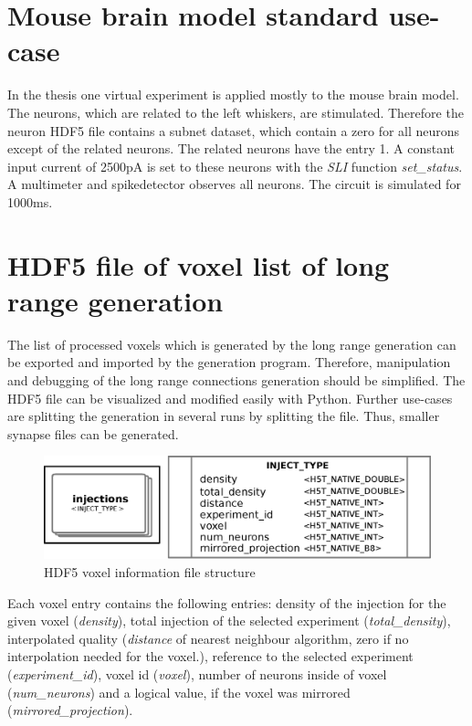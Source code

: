 \section{Mouse brain model standard use-case}
\label{ambmusecase}
In the thesis one virtual experiment is applied mostly to the mouse brain model.
The neurons, which are related to the left whiskers, are stimulated.
Therefore the neuron HDF5 file contains a subnet dataset, which contain a zero
for all neurons except of the related neurons. The related neurons have the entry 1.
A constant input current of 2500pA is set to these neurons with the \emph{SLI} function \emph{set\_status}.
A multimeter and spikedetector observes all neurons.
The circuit is simulated for 1000ms.

\section{HDF5 file of voxel list of long range generation}
\label{file:voxelinfo}
The list of processed voxels which is generated by the long range generation can be exported and imported
by the generation program. Therefore, manipulation and debugging of the long range connections generation should be
simplified. The HDF5 file can be visualized and modified easily with Python. Further use-cases are 
splitting the generation in several runs by splitting the file. Thus, smaller synapse files can be generated.

\begin{figure}[ht!]
\centering
\includegraphics[scale=0.6]{pictures/hdf5_voxel_format.eps}
\caption{HDF5 voxel information file structure}
\end{figure}

Each voxel entry contains the following entries: density of the injection for the given voxel (\emph{density}),
total injection of the selected experiment (\emph{total\_density}),
interpolated quality (\emph{distance} of nearest neighbour algorithm, zero if no interpolation needed for the voxel.),
reference to the selected experiment (\emph{experiment\_id}),
voxel id (\emph{voxel}),
number of neurons inside of voxel (\emph{num\_neurons}) and
a logical value, if the voxel was mirrored (\emph{mirrored\_projection}).




